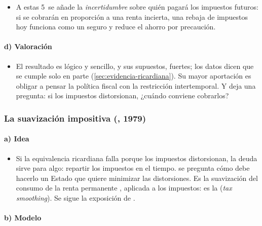 \documentclass[11pt]{article}
\begin{document}
\begin{itemize}
\begin{enumerate}
  \item \emph{Miopía o racionalidad limitada}: hogares que no anticipan los impuestos futuros consumen la rebaja .
  \end{enumerate}
\item A estas 5~se añade la \emph{incertidumbre} sobre quién pagará los impuestos futuros: si se cobrarán en proporción a una renta incierta, una rebaja de impuestos hoy funciona como un seguro y reduce el ahorro por precaución\nocite{BarskyMankiwZeldes1986Ricardian}.
\end{itemize}

\paragraph{d) Valoración}

\begin{itemize}
\item El resultado es lógico y sencillo, y sus supuestos, fuertes; los datos dicen que se cumple solo en parte (\ref{sec:evidencia-ricardiana}). Su mayor aportación es obligar a pensar la política fiscal con la restricción intertemporal. Y deja una pregunta: si los impuestos distorsionan, ¿cuándo conviene cobrarlos?
\end{itemize}

\subsubsection{La suavización impositiva (, 1979)}\label{sec:suavizacion}

\paragraph{a) Idea}

\begin{itemize}
\item Si la equivalencia ricardiana falla porque los impuestos distorsionan, la deuda sirve para algo: repartir los impuestos en el tiempo. \textcite{Barro1979Determination} se pregunta cómo debe hacerlo un Estado que quiere minimizar las distorsiones. Es la suavización del consumo de la renta permanente , aplicada a los impuestos: es la  (\emph{tax smoothing}). Se sigue la exposición de \textcite[cap.~13]{Romer2019Advanced}.
\end{itemize}

\paragraph{b) Modelo}
\end{document}

